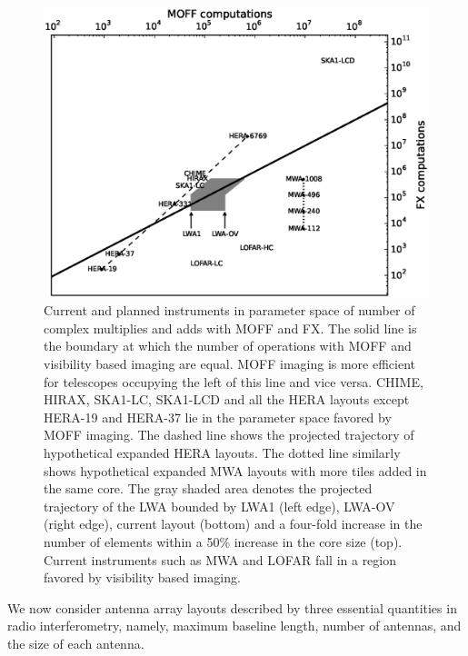 \documentclass[a4paper,fleqn,usenatbib]{mnras}
\begin{document}
\begin{figure}
  \includegraphics[width=\columnwidth]{MOFF_FX_computations_fov_gridding_annotated}
  \caption{Current and planned instruments in parameter space of
    number of complex multiplies and adds with MOFF and FX. The solid line
    is the boundary at which the number of operations with MOFF and visibility 
    based imaging are equal. MOFF imaging is more efficient for telescopes 
    occupying the left of this line and vice versa. CHIME, HIRAX, SKA1-LC, 
    SKA1-LCD and all the HERA layouts except HERA-19 and HERA-37 lie in the 
    parameter space favored by MOFF imaging. The dashed line shows the projected 
    trajectory of hypothetical expanded HERA layouts. The dotted line similarly
    shows hypothetical expanded MWA layouts with more tiles added in the same
    core. The gray shaded area denotes the projected trajectory of the LWA 
    bounded by LWA1 (left edge), LWA-OV (right edge), current layout (bottom) 
    and a four-fold increase in the number of elements within a 50\% increase in 
    the core size (top). Current instruments such as MWA and LOFAR fall in a 
    region favored by visibility based imaging.}
  \label{fig:parameter-space-computations-instruments}
\end{figure}

We now consider antenna array layouts described by three essential quantities 
in radio interferometry, namely, maximum baseline length, number of antennas,
and the size of each antenna. 
\end{document}
